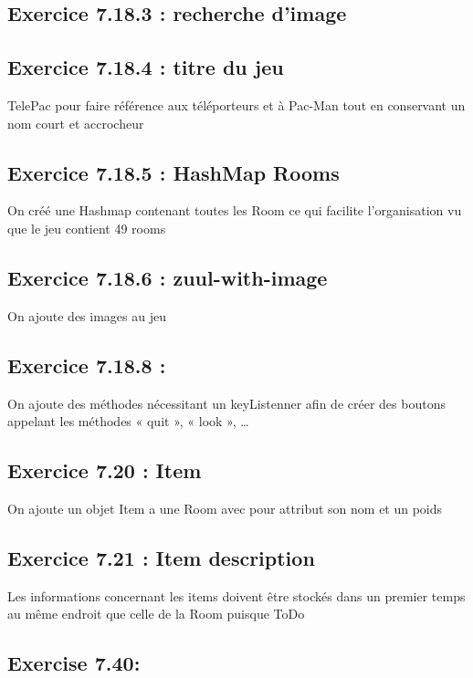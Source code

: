 \documentclass[twoside,french]{report}
\begin{document}
\subsection*{Exercice 7.18.3 : recherche d’image}

\subsection*{Exercice 7.18.4 : titre du jeu}
TelePac pour faire référence aux téléporteurs et à Pac-Man tout en conservant un nom court et accrocheur

\subsection*{Exercice 7.18.5 : HashMap Rooms}
On créé une Hashmap contenant toutes les Room ce qui facilite l’organisation vu que le jeu contient 49 rooms

\subsection*{Exercice 7.18.6 : zuul-with-image}
On ajoute des images au jeu
\subsection*{Exercice 7.18.8 :} 
On ajoute des méthodes nécessitant un keyListenner afin de créer des boutons appelant les méthodes « quit », « look », …
\subsection*{Exercice 7.20 : Item}
On ajoute un objet Item a une Room avec pour attribut son nom et un poids 

\subsection*{Exercice 7.21 : Item description}

Les informations concernant les items doivent être stockés dans un premier temps au même endroit que celle de la Room puisque ToDo












\subsection*{Exercise 7.40:}
\end{document}
